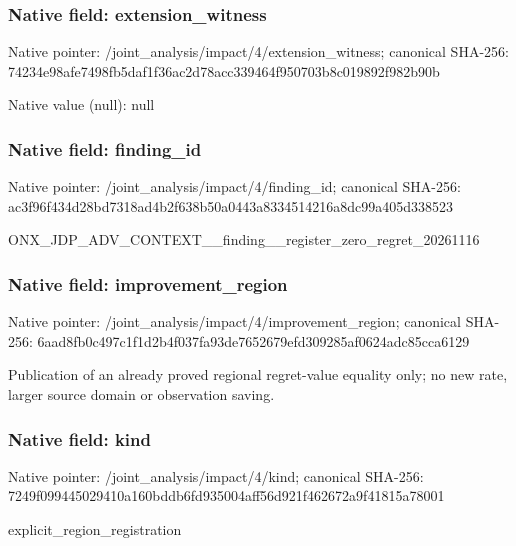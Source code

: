 \documentclass[10pt,a4paper]{article}
\begin{document}
\subsubsection{Native field: extension\_\allowbreak{}witness}
Native pointer: /joint\_\allowbreak{}analysis/impact/4/extension\_\allowbreak{}witness; canonical SHA-256: 74234e98afe7498fb5daf1f36ac2d78acc339464f950703b8c019892f982b90b

Native value (null): null

\subsubsection{Native field: finding\_\allowbreak{}id}
Native pointer: /joint\_\allowbreak{}analysis/impact/4/finding\_\allowbreak{}id; canonical SHA-256: ac3f96f434d28bd7318ad4b2f638b50a0443a8334514216a8dc99a405d338523

\begingroup\raggedright\sloppy ONX\_\allowbreak{}JDP\_\allowbreak{}ADV\_\allowbreak{}CONTEXT\_\allowbreak{}\_\allowbreak{}finding\_\allowbreak{}\_\allowbreak{}register\_\allowbreak{}zero\_\allowbreak{}regret\_\allowbreak{}20261116\par\endgroup

\subsubsection{Native field: improvement\_\allowbreak{}region}
Native pointer: /joint\_\allowbreak{}analysis/impact/4/improvement\_\allowbreak{}region; canonical SHA-256: 6aad8fb0c497c1f1d2b4f037fa93de7652679efd309285af0624adc85cca6129

\begingroup\raggedright\sloppy Publication of an already proved regional regret-value equality only;\allowbreak{} no new rate,\allowbreak{} larger source domain or observation saving.\par\endgroup

\subsubsection{Native field: kind}
Native pointer: /joint\_\allowbreak{}analysis/impact/4/kind; canonical SHA-256: 7249f099445029410a160bddb6fd935004aff56d921f462672a9f41815a78001

\begingroup\raggedright\sloppy explicit\_\allowbreak{}region\_\allowbreak{}registration\par\endgroup
\end{document}
